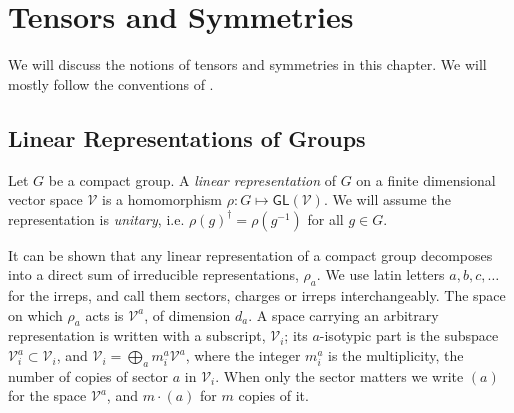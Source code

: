 \chapter{Tensors and Symmetries}
We will discuss the notions of tensors and symmetries in this chapter. We will mostly follow the conventions of \cite{tensorkit,tenpy2024}. 
\section{Linear Representations of Groups}
\begin{definition}
Let $G$ be a compact group. A \emph{linear representation} of $G$ on a finite dimensional vector space $\mathscr{V}$ is a homomorphism $\rho:G\mapsto\mathsf{GL}(\mathscr{V})$. We will assume the representation is \emph{unitary}, i.e. $\rho(g)^\dagger=\rho(g^{-1})$ for all $g\in G$. 
\end{definition}

It can be shown that any linear representation of a compact group decomposes into a direct sum of irreducible representations, $\rho_a$. We use latin letters $a,b,c,\ldots$ for the irreps, and call them sectors, charges or irreps interchangeably. The space on which $\rho_a$ acts is $\mathscr{V}^a$, of dimension $d_a$. A space carrying an arbitrary representation is written with a subscript, $\mathscr{V}_i$; its $a$-isotypic part is the subspace $\mathscr{V}_i^a\subset\mathscr{V}_i$, and $\mathscr{V}_i=\bigoplus_a m_i^a\mathscr{V}^a$, where the integer $m_i^a$ is the multiplicity, the number of copies of sector $a$ in $\mathscr{V}_i$. When only the sector matters we write $(a)$ for the space $\mathscr{V}^a$, and $m\cdot(a)$ for $m$ copies of it.

